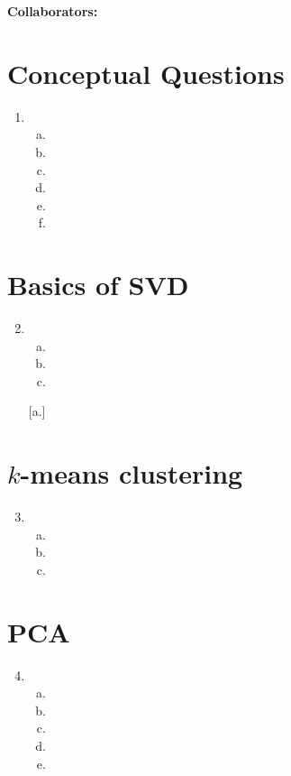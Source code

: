 \documentclass{article}
\newcommand{\1}[1]{\mathbf{1}\left\{#1\right\}}
\begin{document}
\textbf{Collaborators:}
\section*{Conceptual Questions}
\begin{enumerate}[1.]
\item \begin{enumerate}[a.]
      \item
      \item
      \item
      \item
      \item
      \item
      \end{enumerate}
\end{enumerate}

\section*{Basics of SVD}
\begin{enumerate}[1.]
\setcounter{enumi}{1}
\item \begin{enumerate}[a.]
      \item 
      \item 
      \item 
      \end{enumerate}[a.]
\end{enumerate}

\section*{$k$-means clustering}
\begin{enumerate}[1.]
\setcounter{enumi}{2}
\item \begin{enumerate}[a.]
      \item
      \item
      \item
      \end{enumerate}
\end{enumerate}

\section*{PCA}
\begin{enumerate}[1.]
\setcounter{enumi}{3}
\item \begin{enumerate}[a.]
      \item
      \item
      \item
      \item
      \item
      \end{enumerate}
\end{enumerate}
\end{document}
